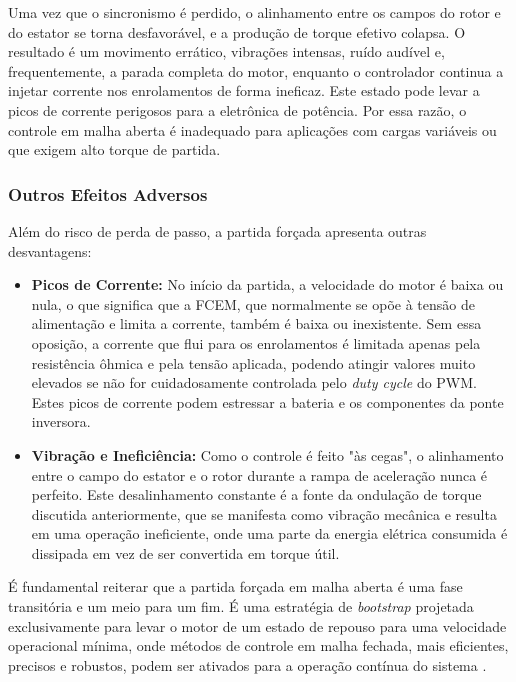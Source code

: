 \documentclass[12pt, a4paper, openright, oneside, brazilian]{abntex2}
\begin{document}
Uma vez que o sincronismo é perdido, o alinhamento entre os campos do rotor e do estator se torna desfavorável, e a produção de torque efetivo colapsa. O resultado é um movimento errático, vibrações intensas, ruído audível e, frequentemente, a parada completa do motor, enquanto o controlador continua a injetar corrente nos enrolamentos de forma ineficaz. Este estado pode levar a picos de corrente perigosos para a eletrônica de potência. Por essa razão, o controle em malha aberta é inadequado para aplicações com cargas variáveis ou que exigem alto torque de partida.

\subsubsection{Outros Efeitos Adversos}

Além do risco de perda de passo, a partida forçada apresenta outras desvantagens:

\begin{itemize}
    \item \textbf{Picos de Corrente:} No início da partida, a velocidade do motor é baixa ou nula, o que significa que a FCEM, que normalmente se opõe à tensão de alimentação e limita a corrente, também é baixa ou inexistente. Sem essa oposição, a corrente que flui para os enrolamentos é limitada apenas pela resistência ôhmica e pela tensão aplicada, podendo atingir valores muito elevados se não for cuidadosamente controlada pelo \textit{duty cycle} do PWM. Estes picos de corrente podem estressar a bateria e os componentes da ponte inversora.
    \item \textbf{Vibração e Ineficiência:} Como o controle é feito "às cegas", o alinhamento entre o campo do estator e o rotor durante a rampa de aceleração nunca é perfeito. Este desalinhamento constante é a fonte da ondulação de torque discutida anteriormente, que se manifesta como vibração mecânica e resulta em uma operação ineficiente, onde uma parte da energia elétrica consumida é dissipada em vez de ser convertida em torque útil.
\end{itemize}

É fundamental reiterar que a partida forçada em malha aberta é uma fase transitória e um meio para um fim. É uma estratégia de \textit{bootstrap} projetada exclusivamente para levar o motor de um estado de repouso para uma velocidade operacional mínima, onde métodos de controle em malha fechada, mais eficientes, precisos e robustos, podem ser ativados para a operação contínua do sistema \cite{ti2022minimizing, nxp2023sensorless}.
\end{document}
